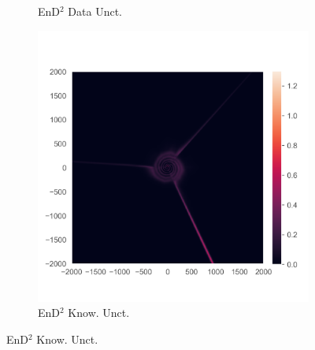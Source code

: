 \begin{figure}
\begin{subfigure}{0.22\textwidth}
  \caption{EnD$^2$ Data Unct.}
  \label{fig:3e}
\end{subfigure}%
\begin{subfigure}{0.22\textwidth}
  \centering
  \includegraphics[trim=42 45 15 55, clip, width=\linewidth]{../openreview/plots/3f.png}
  \caption{EnD$^2$ Know. Unct.}
  \label{fig:3f}
\end{subfigure}%


\end{figure}
